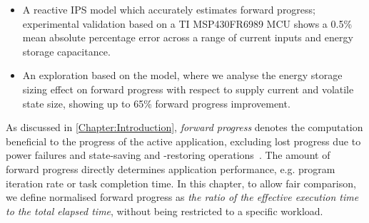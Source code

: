 \begin{itemize}
    \item A reactive IPS model which accurately estimates forward progress; experimental validation based on a TI MSP430FR6989 MCU shows a 0.5\% mean absolute percentage error across a range of current inputs and energy storage capacitance. 
	\item An exploration based on the model, where we analyse the energy storage sizing effect on forward progress with respect to supply current and volatile state size, showing up to 65\% forward progress improvement.


\end{itemize}

As discussed in \cref{Chapter:Introduction}, \textit{forward progress} denotes the computation beneficial to the progress of the active application, excluding lost progress due to power failures and state-saving and -restoring operations~\cite{7478428}. 
The amount of forward progress directly determines application performance, e.g. program iteration rate or task completion time. 
In this chapter, to allow fair comparison, we define normalised forward progress as \textit{the ratio of the effective execution time to the total elapsed time}, without being restricted to a specific workload. 


